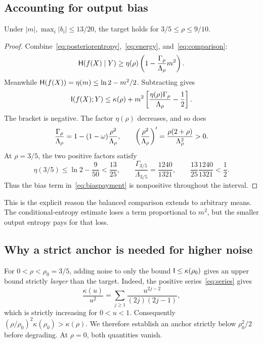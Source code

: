 \subsection{Accounting for output bias}
\begin{proposition}\label{prop:middle}
Under $|m|,\max_i|b_i|\le13/20$, the target holds for $3/5\le\rho\le9/10$.
\end{proposition}
\begin{proof}
Combine~\eqref{eq:posteriorentropy},~\eqref{eq:energy}, and~\eqref{eq:comparison}:
\[
\mathsf H(f(X)\mid Y)\ge\eta(\rho)\left(1-\frac{\Gamma_\rho}{\Lambda_\rho}m^2\right).
\]
Meanwhile $\mathsf H(f(X))=\eta(m)\le\ln2-m^2/2$. Subtracting gives
\begin{equation}\label{eq:biaspayment}
\mathsf I(f(X);Y)\le\kappa(\rho)+m^2\left[\frac{\eta(\rho)\Gamma_\rho}{\Lambda_\rho}-\frac12\right].
\end{equation}
The bracket is negative. The factor $\eta(\rho)$ decreases, and so does
\[
\frac{\Gamma_\rho}{\Lambda_\rho}
=1-(1-\omega)\frac{\rho^2}{\Lambda_\rho},
\qquad
\left(\frac{\rho^2}{\Lambda_\rho}\right)'=\frac{\rho(2+\rho)}{\Lambda_\rho^2}>0.
\]
At $\rho=3/5$, the two positive factors satisfy
\[
\eta(3/5)\le\ln2-\frac9{50}<\frac{13}{25},\qquad
\frac{\Gamma_{3/5}}{\Lambda_{3/5}}=\frac{1240}{1321},\qquad
\frac{13}{25}\frac{1240}{1321}<\frac12.
\]
Thus the bias term in~\eqref{eq:biaspayment} is nonpositive throughout the interval.
\end{proof}
This is the explicit reason the balanced comparison extends to arbitrary means. The conditional-entropy estimate loses a term proportional to $m^2$, but the smaller output entropy pays for that loss.

\subsection{Why a strict anchor is needed for higher noise}
For $0<\rho<\rho_0=3/5$, adding noise to only the bound $\mathsf I\le\kappa(\rho_0)$ gives an upper bound strictly \emph{larger} than the target. Indeed, the positive series~\eqref{eq:series} gives
\[
\frac{\kappa(u)}{u^2}=\sum_{j\ge1}\frac{u^{2j-2}}{(2j)(2j-1)},
\]
which is strictly increasing for $0<u<1$. Consequently $(\rho/\rho_0)^2\kappa(\rho_0)>\kappa(\rho)$. We therefore establish an anchor strictly below $\rho_0^2/2$ before degrading. At $\rho=0$, both quantities vanish.

